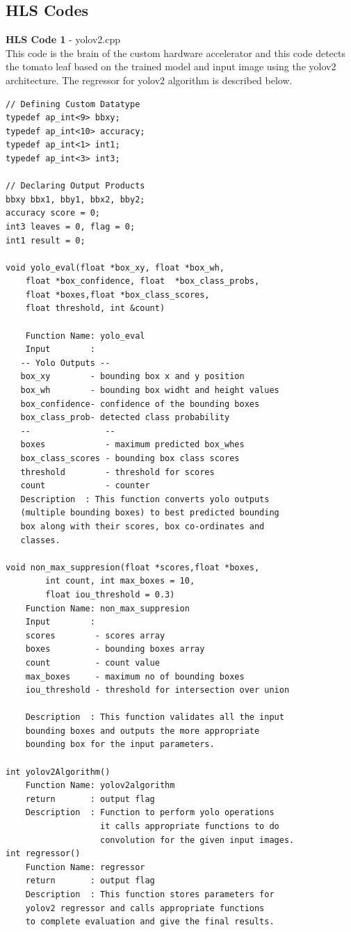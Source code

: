 \documentclass[a4paper,12pt,oneside]{book}
\begin{document}
\subsection*{HLS Codes}
\textbf{HLS Code 1} - yolov2.cpp\vspace{0.2cm}\\
This code is the brain of the custom hardware accelerator and this code detects the tomato leaf based on the trained model and input image using the yolov2 architecture. The regressor for yolov2 algorithm is described below.\vspace{0.2cm}
\begin{lstlisting}
// Defining Custom Datatype
typedef ap_int<9> bbxy;
typedef ap_int<10> accuracy;
typedef ap_int<1> int1;
typedef ap_int<3> int3;

// Declaring Output Products
bbxy bbx1, bby1, bbx2, bby2;
accuracy score = 0;
int3 leaves = 0, flag = 0;
int1 result = 0;

void yolo_eval(float *box_xy, float *box_wh, 
    float *box_confidence, float  *box_class_probs,
    float *boxes,float *box_class_scores,
    float threshold, int &count)

    Function Name: yolo_eval
    Input        : 
   -- Yolo Outputs --
   box_xy        - bounding box x and y position
   box_wh        - bounding box widht and height values
   box_confidence- confidence of the bounding boxes
   box_class_prob- detected class probability
   --               --
   boxes            - maximum predicted box_whes
   box_class_scores - bounding box class scores
   threshold        - threshold for scores
   count            - counter
   Description  : This function converts yolo outputs 
   (multiple bounding boxes) to best predicted bounding
   box along with their scores, box co-ordinates and
   classes.

void non_max_suppresion(float *scores,float *boxes,
        int count, int max_boxes = 10,
        float iou_threshold = 0.3)
    Function Name: non_max_suppresion
    Input        : 
    scores        - scores array
    boxes         - bounding boxes array
    count         - count value
    max_boxes     - maximum no of bounding boxes
    iou_threshold - threshold for intersection over union

    Description  : This function validates all the input 
    bounding boxes and outputs the more appropriate 
    bounding box for the input parameters.

int yolov2Algorithm()
    Function Name: yolov2algorithm
    return       : output flag
    Description  : Function to perform yolo operations
                   it calls appropriate functions to do
                   convolution for the given input images.
int regressor()
    Function Name: regressor
    return       : output flag
    Description  : This function stores parameters for
    yolov2 regressor and calls appropriate functions
    to complete evaluation and give the final results.


\end{lstlisting}
\end{document}

